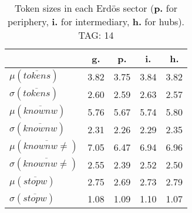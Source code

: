 \begin{table}[h!]
\begin{center}
\begin{tabular}{| l || c | c | c | c |}\hline
 & {\bf g.} & {\bf p.} & {\bf i.} & {\bf h.} \\\hline\hline
$\mu(\overline{tokens})$ & 3.82  & 3.75  & 3.84  & 3.82 \\
$\sigma(\overline{tokens})$ & 2.60  & 2.59  & 2.63  & 2.57 \\\hline
$\mu(\overline{knownw})$ & 5.76  & 5.67  & 5.74  & 5.80 \\
$\sigma(\overline{knownw})$ & 2.31  & 2.26  & 2.29  & 2.35 \\\hline
$\mu(\overline{knownw \neq})$ & 7.05  & 6.47  & 6.94  & 6.96 \\
$\sigma(\overline{knownw \neq})$ & 2.55  & 2.39  & 2.52  & 2.50 \\\hline
$\mu(\overline{stopw})$ & 2.75  & 2.69  & 2.73  & 2.79 \\
$\sigma(\overline{stopw})$ & 1.08  & 1.09  & 1.10  & 1.07 \\\hline
\end{tabular}
\caption{Token sizes in each Erd\"os sector ({{\bf p.}} for periphery, {{\bf i.}} for intermediary, {{\bf h.}} for hubs). TAG: 14}
\end{center}
\end{table}